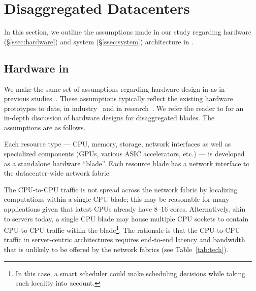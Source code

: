 \vspace{-0.1in}
\section{Disaggregated Datacenters}
\vspace{-0.05in}
\label{sec:summary}
In this section, we outline the assumptions made in our study regarding hardware (\S\ref{ssec:hardware}) and system (\S\ref{ssec:system}) architecture in \dis. 

\vspace{-0.1in}
\subsection{Hardware in \dis}
\vspace{-0.05in}
\label{ssec:hardware}
We make the same set of assumptions regarding hardware design in \dis as in previous studies~\cite{ddcHwDesign1, ddcHwDesign2, ddcHwDesign3}. These assumptions typically reflect the existing hardware prototypes to date, in industry~\cite{rsa, hptm, fdr} and in research~\cite{sonuma, firebox}. We refer the reader to \cite{ddcHwDesign1, ddcHwDesign2, ddcHwDesign3} for an in-depth discussion of hardware designs for disaggregated blades. The assumptions are as follows.

Each resource type --- CPU, memory, storage, network interfaces as well as specialized components (GPUs, various ASIC accelerators, etc.) --- is developed as a standalone hardware ``blade''. Each resource blade has a network interface to the datacenter-wide network fabric.

The CPU-to-CPU traffic is not spread across the network fabric by localizing computations within a single CPU blade; this may be reasonable for many applications given that latest CPUs already have $8$--$16$ cores. Alternatively, akin to servers today, a single CPU blade may house multiple CPU sockets to contain CPU-to-CPU traffic within the blade{\footnote{In this case, a smart scheduler could make scheduling decisions while taking such locality into account.}}. The rationale is that the CPU-to-CPU traffic in server-centric architectures requires end-to-end latency and bandwidth that is unlikely to be offered by the network fabrics (see Table~\ref{tab:tech}).

